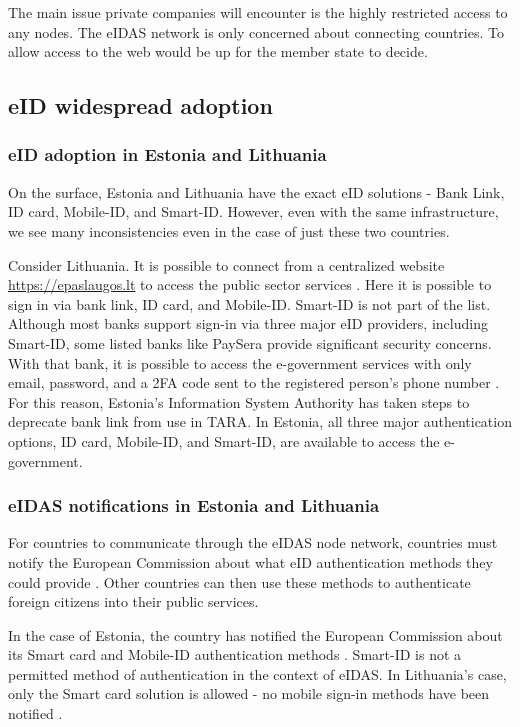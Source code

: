 The main issue private companies will encounter is the highly restricted access to any nodes. The eIDAS network is only concerned about connecting countries. To allow access to the web would be up for the member state to decide.

\subsection{eID widespread adoption}

\subsubsection{eID adoption in Estonia and Lithuania}

On the surface, Estonia and Lithuania have the exact eID solutions - Bank Link, ID card, Mobile-ID, and Smart-ID. However, even with the same infrastructure, we see many inconsistencies even in the case of just these two countries.

Consider Lithuania. It is possible to connect from a centralized website \url{https://epaslaugos.lt} to access the public sector services \cite{eidasnode-lt}. Here it is possible to sign in via bank link, ID card, and Mobile-ID. Smart-ID is not part of the list. Although most banks support sign-in via three major eID providers, including Smart-ID, some listed banks like PaySera provide significant security concerns. With that bank, it is possible to access the e-government services with only email, password, and a 2FA code sent to the registered person's phone number . For this reason, Estonia's Information System Authority has taken steps to deprecate bank link \cite{ria-deprecates-bank-link} from use in TARA. In Estonia, all three major authentication options, ID card, Mobile-ID, and Smart-ID, are available to access the e-government.

\subsubsection{eIDAS notifications in Estonia and Lithuania}

For countries to communicate through the eIDAS node network, countries must notify the European Commission about what eID authentication methods they could provide \cite{eulaw-eidas}. Other countries can then use these methods to authenticate foreign citizens into their public services.

In the case of Estonia, the country has notified the European Commission about its Smart card and Mobile-ID authentication methods \cite{eulaw-eidas-notified}. Smart-ID is not a permitted method of authentication in the context of eIDAS. In Lithuania's case, only the Smart card solution is allowed - no mobile sign-in methods have been notified \cite{eulaw-eidas-notified}.


